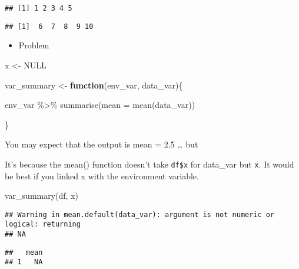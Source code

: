 \documentclass[
]{book}
\newenvironment{Shaded}{\begin{snugshade}}{\end{snugshade}}
\newcommand{\AttributeTok}[1]{\textcolor[rgb]{0.77,0.63,0.00}{#1}}
\newcommand{\ConstantTok}[1]{\textcolor[rgb]{0.00,0.00,0.00}{#1}}
\newcommand{\ControlFlowTok}[1]{\textcolor[rgb]{0.13,0.29,0.53}{\textbf{#1}}}
\newcommand{\FunctionTok}[1]{\textcolor[rgb]{0.00,0.00,0.00}{#1}}
\newcommand{\NormalTok}[1]{#1}
\newcommand{\OtherTok}[1]{\textcolor[rgb]{0.56,0.35,0.01}{#1}}
\newcommand{\SpecialCharTok}[1]{\textcolor[rgb]{0.00,0.00,0.00}{#1}}
\providecommand{\tightlist}{%
  \setlength{\itemsep}{0pt}\setlength{\parskip}{0pt}}
\begin{document}
\begin{verbatim}
## [1] 1 2 3 4 5
\end{verbatim}

\begin{Shaded}
\end{Shaded}

\begin{verbatim}
## [1]  6  7  8  9 10
\end{verbatim}

\begin{itemize}
\tightlist
\item
  Problem
\end{itemize}

\begin{Shaded}
\begin{Highlighting}[]
\NormalTok{x }\OtherTok{\textless{}{-}} \ConstantTok{NULL} 

\NormalTok{var\_summary }\OtherTok{\textless{}{-}} \ControlFlowTok{function}\NormalTok{(env\_var, data\_var)\{}
 
\NormalTok{   env\_var }\SpecialCharTok{\%\textgreater{}\%}
    \FunctionTok{summarise}\NormalTok{(}\AttributeTok{mean =} \FunctionTok{mean}\NormalTok{(data\_var))}

\NormalTok{\}}
\end{Highlighting}
\end{Shaded}

You may expect that the output is mean = 2.5 \ldots{} but

It's because the mean() function doesn't take \texttt{df\$x} for data\_var but \texttt{x}. It would be best if you linked x with the environment variable.

\begin{Shaded}
\begin{Highlighting}[]
\FunctionTok{var\_summary}\NormalTok{(df, x)}
\end{Highlighting}
\end{Shaded}

\begin{verbatim}
## Warning in mean.default(data_var): argument is not numeric or logical: returning
## NA
\end{verbatim}

\begin{verbatim}
##   mean
## 1   NA
\end{verbatim}
\end{document}
